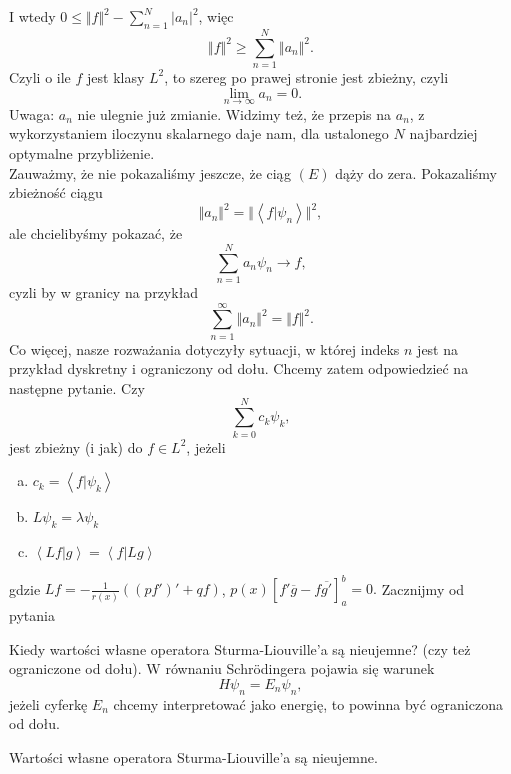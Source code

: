 \documentclass[../main.tex]{subfiles}
\begin{document}
		I wtedy $0 \le \Vert f \Vert ^2 - \sum_{n=1}^N |a_n|^2$, więc
		\[
		\Vert f \Vert ^2 \ge \sum_{n=1}^N \Vert a_n \Vert ^2
		.\]
		Czyli o ile $f$ jest klasy $L^2$, to szereg po prawej stronie jest zbieżny, czyli
		\[
		\lim_{n \to \infty}a_n = 0
		.\]
		Uwaga: $a_n$ nie ulegnie już zmianie. Widzimy też, że przepis na $a_n$, z wykorzystaniem iloczynu skalarnego daje nam, dla ustalonego $N$ najbardziej optymalne przybliżenie.\\
		Zauważmy, że nie pokazaliśmy jeszcze, że ciąg  $(E)$ dąży do zera. Pokazaliśmy zbieżność ciągu
		\[
		\Vert a_n \Vert ^2 = \Vert \left<f|\psi_n \right> \Vert ^2
		,\]
		ale chcielibyśmy pokazać, że
		\[
		\sum_{n=1}^N a_n\psi_n \to f
		,\]
		cyzli by w granicy na przykład
		\[
				\sum_{n=1}^\infty \Vert a_n \Vert ^2 = \Vert f \Vert ^2
		.\]
		Co więcej, nasze rozważania dotyczyły sytuacji, w której indeks $n$ jest na przykład dyskretny i ograniczony od dołu. Chcemy zatem odpowiedzieć na następne pytanie. Czy
		\[
		\sum_{k=0}^{N} c_k\psi_k
		,\]
		jest zbieżny (i jak) do $f\in L^2$, jeżeli
\begin{enumerate}[a)]
		\item $c_k = \left<f|\psi_k \right>$
		\item $L \psi_k = \lambda \psi_k$
		\item $\left<Lf|g \right> = \left<f|Lg \right>$
\end{enumerate}
gdzie $Lf = -\frac{1}{r(x)}\left( \left( pf' \right) '+ qf \right) $, $p(x) \left[ f'\overline{g}  - f \overline{g'}  \right] _a^b = 0.$
Zacznijmy od pytania
\begin{pytanie}
		Kiedy wartości własne operatora Sturma-Liouville'a są nieujemne? (czy też ograniczone od dołu). W równaniu Schrödingera pojawia się warunek
		\[
		H\psi_n = E_n \psi_n
		,\]
		jeżeli cyferkę $E_n$ chcemy interpretować jako energię, to powinna być ograniczona od dołu.
\end{pytanie}
\begin{stw}
		Wartości własne operatora Sturma-Liouville'a są nieujemne.
\end{stw}
\end{document}
